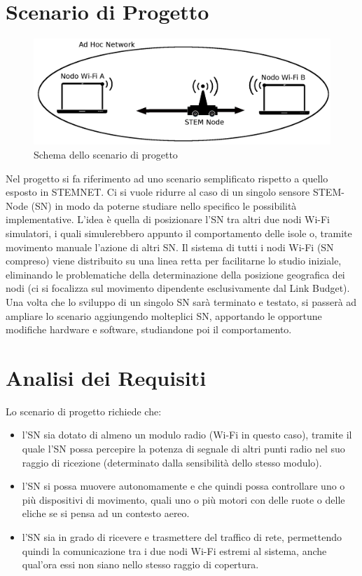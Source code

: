 \documentclass[a4paper,11pt]{report}
\begin{document}
\section{Scenario di Progetto}
\begin{figure}
\centering
\includegraphics[scale=0.25]{scenario.png}
\caption{Schema dello scenario di progetto}
\end{figure}
Nel progetto si fa riferimento ad uno scenario semplificato rispetto a quello esposto in STEMNET.
Ci si vuole ridurre al caso di un singolo sensore STEM-Node (SN) in modo da poterne studiare nello specifico le possibilità implementative.
L'idea è quella di posizionare l'SN tra altri due nodi Wi-Fi simulatori, i quali simulerebbero appunto il comportamento delle isole o, tramite movimento manuale l'azione di altri SN. 
Il sistema di tutti i nodi Wi-Fi (SN compreso) viene distribuito su una linea retta per facilitarne lo studio iniziale, eliminando le problematiche della determinazione della posizione geografica dei nodi (ci si focalizza sul movimento dipendente esclusivamente dal Link Budget).
Una volta che lo sviluppo di un singolo SN sarà terminato e testato, si passerà ad ampliare lo scenario aggiungendo molteplici SN, apportando le opportune modifiche hardware e software, studiandone poi il comportamento.



\section{Analisi dei Requisiti}
Lo scenario di progetto richiede che:
\begin{itemize}
\item
l'SN sia dotato di almeno un modulo radio (Wi-Fi in questo caso), tramite il quale l'SN possa percepire la potenza di segnale di altri punti radio nel suo raggio di ricezione (determinato dalla sensibilità dello stesso modulo).
\item
l'SN si possa muovere autonomamente e che quindi possa controllare uno o più dispositivi di movimento, quali uno o più motori con delle ruote o delle eliche se si pensa ad un contesto aereo.
\item
l'SN sia in grado di ricevere e trasmettere del traffico di rete, permettendo quindi la comunicazione tra i due nodi Wi-Fi estremi al sistema, anche qual'ora essi non siano nello stesso raggio di copertura.    
\end{itemize}
\end{document}
